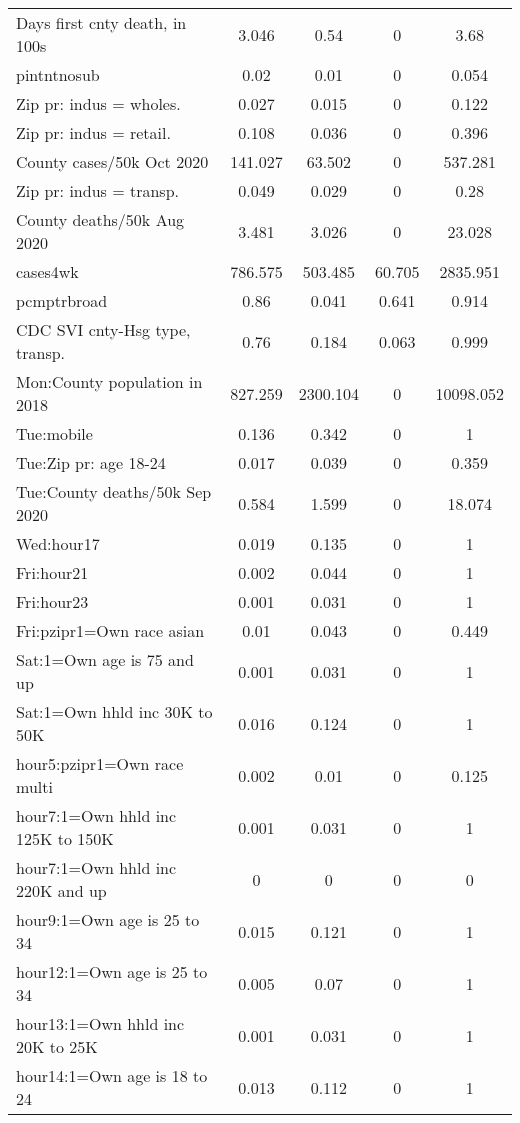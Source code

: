 {\begin{longtable}{l*{4}{c}}
 Days first cnty death, in 100s & 3.046 & 0.54 & 0 & 3.68  \\ 
 pintntnosub & 0.02 & 0.01 & 0 & 0.054  \\ 
 Zip pr: indus = wholes. & 0.027 & 0.015 & 0 & 0.122  \\ 
 Zip pr: indus = retail. & 0.108 & 0.036 & 0 & 0.396  \\ 
 County cases/50k Oct 2020 & 141.027 & 63.502 & 0 & 537.281  \\ 
 Zip pr: indus = transp. & 0.049 & 0.029 & 0 & 0.28  \\ 
 County deaths/50k Aug 2020 & 3.481 & 3.026 & 0 & 23.028  \\ 
 cases4wk & 786.575 & 503.485 & 60.705 & 2835.951  \\ 
 pcmptrbroad & 0.86 & 0.041 & 0.641 & 0.914  \\ 
 CDC SVI cnty-Hsg type, transp. & 0.76 & 0.184 & 0.063 & 0.999  \\ 
 Mon:County population in 2018 & 827.259 & 2300.104 & 0 & 10098.052  \\ 
 Tue:mobile & 0.136 & 0.342 & 0 & 1  \\ 
 Tue:Zip pr: age 18-24 & 0.017 & 0.039 & 0 & 0.359  \\ 
 Tue:County deaths/50k Sep 2020 & 0.584 & 1.599 & 0 & 18.074  \\ 
 Wed:hour17 & 0.019 & 0.135 & 0 & 1  \\ 
 Fri:hour21 & 0.002 & 0.044 & 0 & 1  \\ 
 Fri:hour23 & 0.001 & 0.031 & 0 & 1  \\ 
 Fri:pzipr1=Own race asian & 0.01 & 0.043 & 0 & 0.449  \\ 
 Sat:1=Own age is 75 and up  & 0.001 & 0.031 & 0 & 1  \\ 
 Sat:1=Own hhld inc 30K to 50K & 0.016 & 0.124 & 0 & 1  \\ 
 hour5:pzipr1=Own race multi & 0.002 & 0.01 & 0 & 0.125  \\ 
 hour7:1=Own hhld inc 125K to 150K & 0.001 & 0.031 & 0 & 1  \\ 
 hour7:1=Own hhld inc 220K and up & 0 & 0 & 0 & 0  \\ 
 hour9:1=Own age is 25 to 34 & 0.015 & 0.121 & 0 & 1  \\ 
 hour12:1=Own age is 25 to 34 & 0.005 & 0.07 & 0 & 1  \\ 
 hour13:1=Own hhld inc 20K to 25K & 0.001 & 0.031 & 0 & 1  \\ 
 hour14:1=Own age is 18 to 24 & 0.013 & 0.112 & 0 & 1  \\ 

\end{longtable}}
